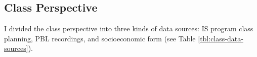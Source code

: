 
        

\subsection{Class Perspective}
\label{results-ss:classroom-data}

I divided the class perspective into three kinds of data sources: \gls{IS} program class planning, \gls{PBL} recordings, and socioeconomic form (see Table \ref{tbl:class-data-sources}).

